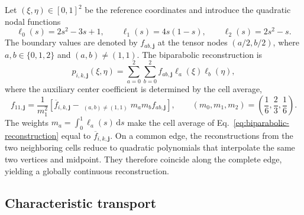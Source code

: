 \documentclass[preprint,3p,12pt]{elsarticle}
\newcommand{\dd}{\,\mathrm{d}}
\newcommand{\vct}[1]{\boldsymbol{#1}}
\newcommand{\avg}[1]{\overline{#1}}
\begin{document}
Let $(\xi,\eta)\in[0,1]^2$ be the reference coordinates and introduce the quadratic nodal functions
\begin{equation}
  \ell_0(s)=2s^2-3s+1,
  \qquad
  \ell_1(s)=4s(1-s),
  \qquad
  \ell_2(s)=2s^2-s.
  \label{eq:quadratic-nodal-basis}
\end{equation}
The boundary values are denoted by $f_{ab,\vct{j}}$ at the tensor nodes $(a/2,b/2)$, where $a,b\in\{0,1,2\}$ and $(a,b)\ne(1,1)$. The biparabolic reconstruction is
\begin{equation}
  p_{i,k,\vct{j}}(\xi,\eta)
  =\sum_{a=0}^{2}\sum_{b=0}^{2}
  f_{ab,\vct{j}}\ell_a(\xi)\ell_b(\eta),
  \label{eq:biparabolic-reconstruction}
\end{equation}
where the auxiliary center coefficient is determined by the cell average,
\begin{equation}
  f_{11,\vct{j}}
  =\frac{1}{m_1^2}
  \left[
  \avg{f}_{i,k,\vct{j}}
  -\mathop{\sum_{a=0}^{2}\sum_{b=0}^{2}}_{(a,b)\ne(1,1)}
  m_am_bf_{ab,\vct{j}}
  \right],
  \qquad
  (m_0,m_1,m_2)=\left(\frac16,\frac23,\frac16\right).
  \label{eq:biparabolic-center}
\end{equation}
The weights $m_a=\int_0^1\ell_a(s)\dd s$ make the cell average of Eq.~\eqref{eq:biparabolic-reconstruction} equal to $\avg{f}_{i,k,\vct{j}}$. On a common edge, the reconstructions from the two neighboring cells reduce to quadratic polynomials that interpolate the same two vertices and midpoint. They therefore coincide along the complete edge, yielding a globally continuous reconstruction.

\subsection{Characteristic transport}
\label{sec:characteristic-transport}
\end{document}
